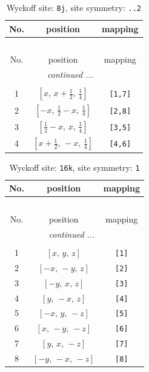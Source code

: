 \documentclass[fleqn,8pt]{jsarticle}
\begin{document}
\renewcommand{\arraystretch}{1.2}
\begin{longtable}{ccc}
\caption{Wyckoff site: {\tt 8j}, site symmetry: {\tt ..2}}
 \\
 \hline \hline
No. & position & mapping \\ \hline \endfirsthead

\multicolumn{2}{l}{\tablename\ \thetable{}} \\
 \hline \hline
No. & position & mapping \\ \hline \endhead

 \hline \hline
\multicolumn{2}{r}{\footnotesize\it continued ...} \\ \endfoot

 \hline \hline
\multicolumn{2}{r}{} \\ \endlastfoot

1 & $\left[ x,\, x + \frac{1}{2},\, \frac{1}{4} \right]$ & {\tt [1,7]} \\ \hline
2 & $\left[ - x,\, \frac{1}{2} - x,\, \frac{1}{4} \right]$ & {\tt [2,8]} \\ \hline
3 & $\left[ \frac{1}{2} - x,\, x,\, \frac{1}{4} \right]$ & {\tt [3,5]} \\ \hline
4 & $\left[ x + \frac{1}{2},\, - x,\, \frac{1}{4} \right]$ & {\tt [4,6]} \\
\end{longtable}
\renewcommand{\arraystretch}{1.2}
\begin{longtable}{ccc}
\caption{Wyckoff site: {\tt 16k}, site symmetry: {\tt 1}}
 \\
 \hline \hline
No. & position & mapping \\ \hline \endfirsthead

\multicolumn{2}{l}{\tablename\ \thetable{}} \\
 \hline \hline
No. & position & mapping \\ \hline \endhead

 \hline \hline
\multicolumn{2}{r}{\footnotesize\it continued ...} \\ \endfoot

 \hline \hline
\multicolumn{2}{r}{} \\ \endlastfoot

1 & $\left[ x,\, y,\, z \right]$ & {\tt [1]} \\ \hline
2 & $\left[ - x,\, - y,\, z \right]$ & {\tt [2]} \\ \hline
3 & $\left[ - y,\, x,\, z \right]$ & {\tt [3]} \\ \hline
4 & $\left[ y,\, - x,\, z \right]$ & {\tt [4]} \\ \hline
5 & $\left[ - x,\, y,\, - z \right]$ & {\tt [5]} \\ \hline
6 & $\left[ x,\, - y,\, - z \right]$ & {\tt [6]} \\ \hline
7 & $\left[ y,\, x,\, - z \right]$ & {\tt [7]} \\ \hline
8 & $\left[ - y,\, - x,\, - z \right]$ & {\tt [8]} \\
\end{longtable}
\end{document}

